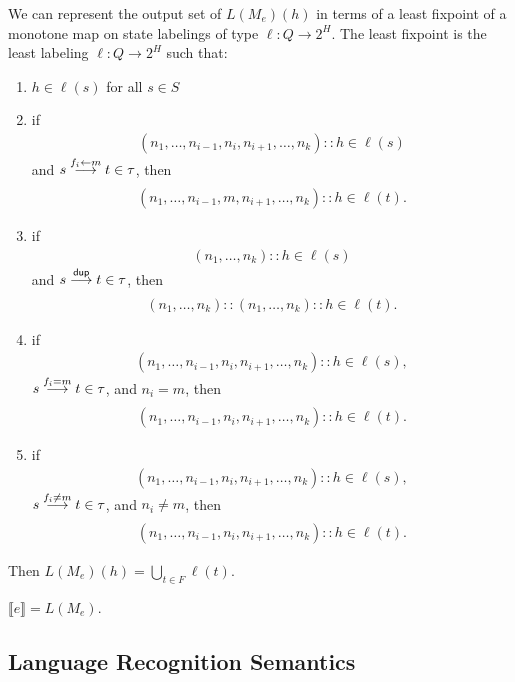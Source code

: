 \documentclass{article}
\newcommand\den[1]{\llbracket #1\rrbracket}
\newcommand\pdup{\mathop{\mathsf{dup}}}
\renewcommand\powerset[1]{2^{#1}}
\begin{document}
We can represent the output set of $L(M_e)(h)$ in terms of a least fixpoint of a monotone map on state labelings of type $\ell:Q\to\powerset H$. The least fixpoint is the least labeling $\ell:Q\to\powerset H$ such that:
\begin{enumerate}
\item
$h\in \ell(s)$ for all $s\in S$
\item
if
\begin{align*}
(n_1,\ldots,n_{i-1},n_i,n_{i+1},\ldots,n_k)::h \in \ell(s)
\end{align*}
and $s\underset{}{\overset{f_i\leftarrow m}\longrightarrow}t\in\tau$, then
\begin{align*}
(n_1,\ldots,n_{i-1},m,n_{i+1},\ldots,n_k)::h \in \ell(t).
\end{align*}
\item
if
\begin{align*}
(n_1,\ldots,n_k)::h \in \ell(s)
\end{align*}
and $s\goesto{\pdup}{}t\in\tau$, then
\begin{align*}
(n_1,\ldots,n_k)::(n_1,\ldots,n_k)::h \in \ell(t).
\end{align*}
\item
if
\begin{align*}
(n_1,\ldots,n_{i-1},n_i,n_{i+1},\ldots,n_k)::h \in \ell(s),
\end{align*}
$s\underset{}{\overset{f_i=m}\longrightarrow}t\in\tau$, and $n_i=m$, then
\begin{align*}
(n_1,\ldots,n_{i-1},n_i,n_{i+1},\ldots,n_k)::h \in \ell(t).
\end{align*}
\item
if
\begin{align*}
(n_1,\ldots,n_{i-1},n_i,n_{i+1},\ldots,n_k)::h \in \ell(s),
\end{align*}
$s\underset{}{\overset{f_i\neq m}\longrightarrow}t\in\tau$, and $n_i\neq m$, then
\begin{align*}
(n_1,\ldots,n_{i-1},n_i,n_{i+1},\ldots,n_k)::h \in \ell(t).
\end{align*}
\end{enumerate}
Then $L(M_e)(h) = \bigcup_{t\in F}\ell(t)$.

\begin{theorem}
$\den e = L(M_e)$.
\end{theorem}

\subsection*{Language Recognition Semantics}
\end{document}
